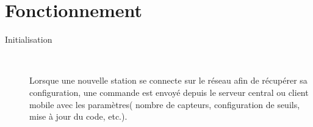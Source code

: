 \documentclass [a4paper] {report}
\begin{document}
\section{Fonctionnement}

\begin{description}

\item[Initialisation]\hfill\\
	\begin{itemize}
	Lorsque une nouvelle station se connecte sur le réseau afin de récupérer sa configuration, une commande est envoyé depuis le serveur central ou client mobile avec les paramètres( nombre de capteurs, configuration de seuils, mise à jour du code, etc.).\\\\
	\end{itemize}


\end{description}
\end{document}
